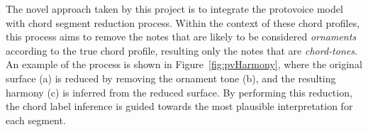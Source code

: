 \documentclass[12pt,a4paper,twoside,openany]{report} \usepackage[pdfborder={0 0 0}]{hyperref}    %
\theoremstyle{definition} \newtheorem{definition}{Definition}[section]
\begin{document}
The novel approach taken by this project is to integrate the protovoice model with chord segment reduction process.
Within the context of these chord profiles, this process aims to remove the notes that are likely to be considered
\textit{ornaments} according to the true chord profile, resulting only the notes that are \textit{chord-tones}. 
An example of the process is shown in
Figure~\ref{fig:pvHarmony}, where the original surface (a) is reduced by removing the ornament tone (b), and the resulting
harmony (c) is inferred from the reduced surface. By performing this reduction, the chord label inference is guided
towards the most plausible interpretation for each segment. 




%
\end{document}
